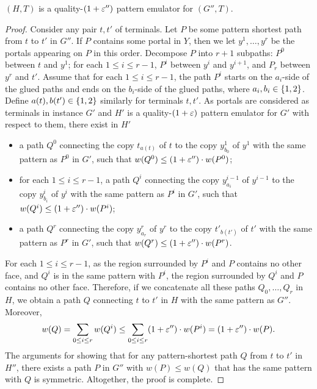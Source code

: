 \begin{claim}
\label{clm: cut glue emulator}
$(H,T)$ is a quality-$(1+{\varepsilon}'')$ pattern emulator for $(G'',T)$.
\end{claim}
\begin{proof}
Consider any pair $t,t'$ of terminals. 
Let $P$ be some pattern shortest path from $t$ to $t'$ in $G''$.
If $P$ contains some portal in $Y$, then we let $y^1,\ldots,y^r$ be the portals appearing on $P$ in this order.
Decompose $P$ into $r+1$ subpaths: $P^0$ between $t$ and $y^1$; for each $1\le i\le r-1$, $P^i$ between $y^{i}$ and $y^{i+1}$, and $P_r$ between $y^{r}$ and $t'$.
Assume that for each $1\le i\le r-1$, the path $P^i$ starts on the $a_i$-side of the glued paths and ends on the $b_i$-side of the glued paths, where $a_i,b_i\in \left\{ 1,2 \right\}$. Define $a(t), b(t')\in \left\{ 1,2 \right\}$ similarly for terminals $t,t'$.
As portals are considered as terminals in instance $G'$ and $H'$ is a quality-$(1+{\varepsilon})$ pattern emulator for $G'$ with respect to them, there exist in $H'$ 
\begin{itemize}
\item a path $Q^0$ connecting the copy $t_{a(t)}$ of $t$ to the copy $y^1_{b_0}$ of $y^1$ with the same pattern as $P^0$ in $G'$, such that $w(Q^0)\le (1+{\varepsilon}'')\cdot w(P^0)$;
\item for each $1\le i\le r-1$, a path $Q^i$ connecting the copy $y^{i-1}_{a_{i}}$ of $y^{i-1}$ to the copy $y^{i}_{b_i}$ of $y^i$ with the same pattern as $P^i$ in $G'$, such that $w(Q^i)\le (1+{\varepsilon}'')\cdot w(P^i)$;
\item a path $Q^r$ connecting the copy $y^r_{a_r}$ of $y^r$ to the copy $t'_{b(t')}$ of $t'$ with the same pattern as $P^r$ in $G'$, such that $w(Q^r)\le (1+{\varepsilon}'')\cdot w(P^r)$.
\end{itemize}

For each $1\le i\le r-1$, as the region surrounded by $P^i$ and $P$ contains no other face, and $Q^i$ is in the same pattern with $P^i$, the region surrounded by $Q^i$ and $P$ contains no other face. Therefore, if we concatenate all these paths $Q_0,\ldots,Q_r$ in $H$, we obtain a path $Q$ connecting $t$ to $t'$ in $H$ with the same pattern as $G''$. Moreover,
\[w(Q)=\sum_{0\le i\le r}w(Q^i)\le \sum_{0\le i\le r}(1+{\varepsilon}'')\cdot w(P^i)=(1+{\varepsilon}'')\cdot w(P).\]
The arguments for showing that for any pattern-shortest path $Q$ from $t$ to $t'$ in $H''$, there exists a path $P$ in $G''$ with $w(P)\le w(Q)$ that has the same pattern with $Q$ is symmetric. Altogether, the proof is complete.
\end{proof}


